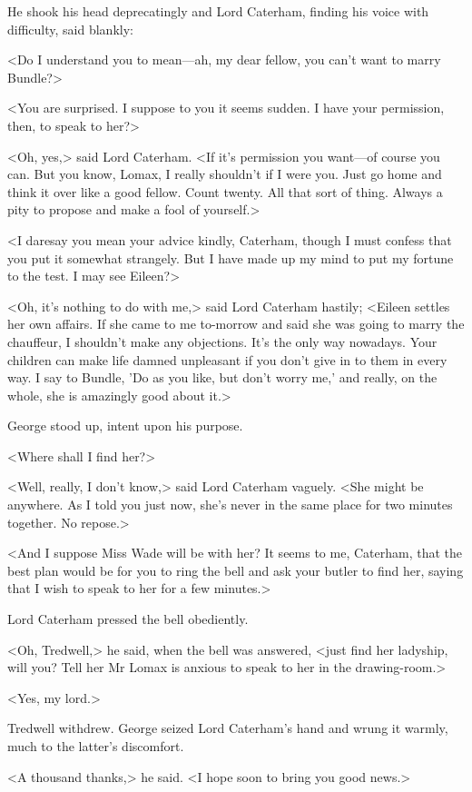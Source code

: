 He shook his head deprecatingly and Lord Caterham, finding his voice with difficulty, said blankly:

<Do I understand you to mean—ah, my dear fellow, you can't want to marry Bundle?>

<You are surprised. I suppose to you it seems sudden. I have your permission, then, to speak to her?>

<Oh, yes,> said Lord Caterham. <If it's permission you want—of course you can. But you know, Lomax, I really shouldn't if I were you. Just go home and think it over like a good fellow. Count twenty. All that sort of thing. Always a pity to propose and make a fool of yourself.>

<I daresay you mean your advice kindly, Caterham, though I must confess that you put it somewhat strangely. But I have made up my mind to put my fortune to the test. I may see Eileen?>

<Oh, it's nothing to do with me,> said Lord Caterham hastily; <Eileen settles her own affairs. If she came to me to-morrow and said she was going to marry the chauffeur, I shouldn't make any objections. It's the only way nowadays. Your children can make life damned unpleasant if you don't give in to them in every way. I say to Bundle, 'Do as you like, but don't worry me,' and really, on the whole, she is amazingly good about it.>

George stood up, intent upon his purpose.

<Where shall I find her?>

<Well, really, I don't know,> said Lord Caterham vaguely. <She might be anywhere. As I told you just now, she's never in the same place for two minutes together. No repose.>

<And I suppose Miss Wade will be with her? It seems to me, Caterham, that the best plan would be for you to ring the bell and ask your butler to find her, saying that I wish to speak to her for a few minutes.>

Lord Caterham pressed the bell obediently.

<Oh, Tredwell,> he said, when the bell was answered, <just find her ladyship, will you? Tell her Mr Lomax is anxious to speak to her in the drawing-room.>

<Yes, my lord.>

Tredwell withdrew. George seized Lord Caterham's hand and wrung it warmly, much to the latter's discomfort.

<A thousand thanks,> he said. <I hope soon to bring you good news.>

